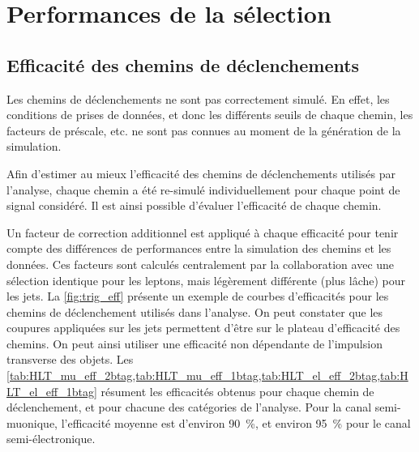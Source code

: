 \section{Performances de la sélection}

\subsection{Efficacité des chemins de déclenchements}

Les chemins de déclenchements ne sont pas correctement simulé. En effet, les conditions de prises de données, et donc les différents seuils de chaque chemin, les facteurs de préscale, etc. ne sont pas connues au moment de la génération de la simulation.

Afin d'estimer au mieux l'efficacité des chemins de déclenchements utilisés par l'analyse, chaque chemin a été re-simulé individuellement pour chaque point de signal considéré. Il est ainsi possible d'évaluer l'efficacité de chaque chemin.

Un facteur de correction additionnel est appliqué à chaque efficacité pour tenir compte des différences de performances entre la simulation des chemins et les données. Ces facteurs sont calculés centralement par la collaboration avec une sélection identique pour les leptons, mais légèrement différente (plus lâche) pour les jets. La \cref{fig:trig_eff} présente un exemple de courbes d'efficacités pour les chemins de déclenchement utilisés dans l'analyse. On peut constater que les coupures appliquées sur les jets permettent d'être sur le plateau d'efficacité des chemins. On peut ainsi utiliser une efficacité non dépendante de l'impulsion transverse des objets. Les \cref{tab:HLT_mu_eff_2btag,tab:HLT_mu_eff_1btag,tab:HLT_el_eff_2btag,tab:HLT_el_eff_1btag} résument les efficacités obtenus pour chaque chemin de déclenchement, et pour chacune des catégories de l'analyse. Pour la canal semi-muonique, l'efficacité moyenne est d'environ \SI{90}{\%}, et environ \SI{95}{\%} pour le canal semi-électronique.

